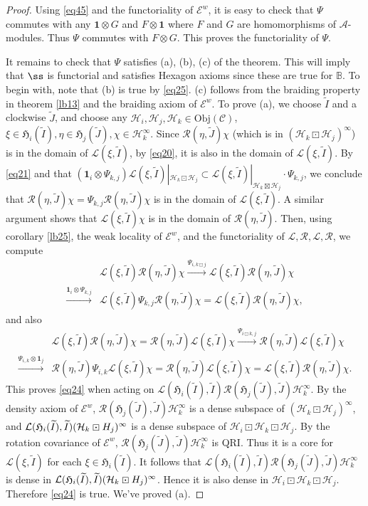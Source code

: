 \documentclass[12pt,a4paper]{article}
\theoremstyle{definition}
\theoremstyle{plain}
\newcommand{\fk}{\mathfrak}
\newcommand{\mc}{\mathcal}
\newcommand{\wtd}{\widetilde}
\newcommand{\id}{\mathbf{1}}
\newcommand{\scr}{\mathscr}
\newcommand{\mbb}{\mathbb}
\newcommand{\Obj}{\mathrm{Obj}}
\numberwithin{equation}{subsection}
\begin{document}
\begin{proof}
Using \eqref{eq45} and the functoriality of $\scr E^w$, it is easy to check that $\Psi$ commutes with any $\id\otimes G$ and $F\otimes\id$ where $F$ and $G$ are homomorphisms of $\mc A$-modules. Thus $\Psi$ commutes with $F\otimes G$. This proves the functoriality of $\Psi$.

It remains to check that $\Psi$ satisfies (a), (b), (c) of the theorem. This will imply that  $\ss$ is functorial and satisfies Hexagon axioms since these are true for $\mbb B$. To begin with, note that (b) is true by \eqref{eq25}. (c) follows from the braiding property in theorem \ref{lb13} and the braiding axiom of $\scr E^w$. To prove (a), we  choose  $\wtd I$ and a clockwise $\wtd J$, and choose any $\mc H_i,\mc H_j,\mc H_k\in\Obj(\scr C)$, $\xi\in\fk H_i(\wtd I),\eta\in\fk H_j(\wtd J),\chi\in\mc H_k^\infty$. Since $\mc R(\eta,\wtd J)\chi$ (which is in $(\mc H_k\boxdot\mc H_j)^\infty$) is in the domain of $\mc L(\xi,\wtd I)$, by \eqref{eq20}, it is also in the domain of $\scr L(\xi,\wtd I)$. By \eqref{eq21} and that $(\id_i\otimes\Psi_{k,j})\scr L(\xi,\wtd I)|_{\mc H_k\boxdot\mc H_j}\subset\scr L(\xi,\wtd I)|_{\mc H_k\boxtimes\mc H_j}\cdot\Psi_{k,j}$, we conclude that  $\scr R(\eta,\wtd J)\chi=\Psi_{k,j}\mc R(\eta,\wtd J)\chi$ is in the domain of  $\scr L(\xi,\wtd I)$. A similar argument shows that $\scr L(\xi,\wtd I)\chi$ is in the domain of $\scr R(\eta,\wtd J)$. Then, using corollary \ref{lb25}, the weak locality of $\scr E^w$, and the functoriality of $\mc L,\mc R,\scr L,\scr R$, we compute
\begin{align*}
&\mc L(\xi,\wtd I)\mc R(\eta,\wtd J)\chi\xrightarrow{\Psi_{i,k\boxdot j}} \scr L(\xi,\wtd I)\mc R(\eta,\wtd J)\chi\\
\xrightarrow{\id_i\otimes\Psi_{k,j}}&\scr L(\xi,\wtd I)\Psi_{k,j}\mc R(\eta,\wtd J)\chi=\scr L(\xi,\wtd I)\scr R(\eta,\wtd J)\chi ,
\end{align*}
and also
\begin{align*}
&\mc L(\xi,\wtd I)\mc R(\eta,\wtd J)\chi=\mc R(\eta,\wtd J)\mc L(\xi,\wtd I)\chi \xrightarrow{\Psi_{i\boxdot k,j}} \scr R(\eta,\wtd J)\mc L(\xi,\wtd I)\chi\\
\xrightarrow{\Psi_{i,k}\otimes\id_j}&\scr R(\eta,\wtd J)\Psi_{i,k}\mc L(\xi,\wtd I)\chi =  \scr R(\eta,\wtd J)\scr L(\xi,\wtd I)\chi=\scr L(\xi,\wtd I)\scr R(\eta,\wtd J)\chi.
\end{align*}
This proves \eqref{eq24} when acting on $\mc L(\fk H_i(\wtd I),\wtd I)\mc R(\fk H_j(\wtd J),\wtd J)\mc H_k^\infty$. By the density axiom of $\scr E^w$, $\mc R(\fk H_j(\wtd J),\wtd J)\mc H_k^\infty$ is a dense subspace of $(\mc H_k\boxdot\mc H_j)^\infty$, and $\mc L(\fk H_i(\wtd I),\wtd I)(\mc H_k\boxdot\mc \mc H_j)^\infty$ is a dense subspace of $\mc H_i\boxdot\mc H_k\boxdot\mc H_j$. By the rotation covariance of $\scr E^w$, $\mc R(\fk H_j(\wtd J),\wtd J)\mc H_k^\infty$ is QRI. Thus it is a core for $\mc L(\xi,\wtd I)$ for each $\xi\in\fk H_i(\wtd I)$. It follows that $\mc L(\fk H_i(\wtd I),\wtd I)\mc R(\fk H_j(\wtd J),\wtd J)\mc H_k^\infty$ is dense in $\mc L(\fk H_i(\wtd I),\wtd I)(\mc H_k\boxdot\mc \mc H_j)^\infty$. Hence it is also dense in $\mc H_i\boxdot\mc H_k\boxdot\mc H_j$. Therefore \eqref{eq24} is true. We've proved (a).
\end{proof}
\end{document}
